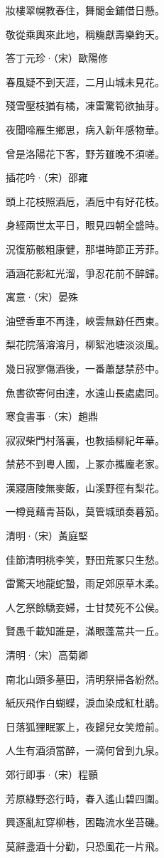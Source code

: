 \documentclass[12pt,a4paper]{ctexbook}
\begin{document}
妝樓翠幌教春住，舞閣金鋪借日懸。\par
敬從乘輿來此地，稱觴獻壽樂鈞天。\par
答丁元珍·（宋）歐陽修\par
春風疑不到天涯，二月山城未見花。\par
殘雪壓枝猶有橘，凍雷驚筍欲抽芽。\par
夜聞啼雁生鄉思，病入新年感物華。\par
曾是洛陽花下客，野芳雖晚不須嗟。\par
插花吟·（宋）邵雍\par
頭上花枝照酒卮，酒卮中有好花枝。\par
身經兩世太平日，眼見四朝全盛時。\par
況復筋骸粗康健，那堪時節正芳菲。\par
酒涵花影紅光溜，爭忍花前不醉歸。\par
寓意·（宋）晏殊\par
油壁香車不再逢，峽雲無跡任西東。\par
梨花院落溶溶月，柳絮池塘淡淡風。\par
幾日寂寥傷酒後，一番蕭瑟禁菸中。\par
魚書欲寄何由達，水遠山長處處同。\par
寒食書事·（宋）趙鼎\par
寂寂柴門村落裏，也教插柳紀年華。\par
禁菸不到粵人國，上冢亦攜龐老家。\par
漢寢唐陵無麥飯，山溪野徑有梨花。\par
一樽竟藉青苔臥，莫管城頭奏暮笳。\par
清明·（宋）黃庭堅\par
佳節清明桃李笑，野田荒冢只生愁。\par
雷驚天地龍蛇蟄，雨足郊原草木柔。\par
人乞祭餘驕妾婦，士甘焚死不公侯。\par
賢愚千載知誰是，滿眼蓬蒿共一丘。\par
清明·（宋）高菊卿\par
南北山頭多墓田，清明祭掃各紛然。\par
紙灰飛作白蝴蝶，淚血染成紅杜鵑。\par
日落狐狸眠冢上，夜歸兒女笑燈前。\par
人生有酒須當醉，一滴何曾到九泉。\par
郊行即事·（宋）程顥\par
芳原綠野恣行時，春入遙山碧四圍。\par
興逐亂紅穿柳巷，困臨流水坐苔磯。\par
莫辭盞酒十分勸，只恐風花一片飛。\par
\end{document}
